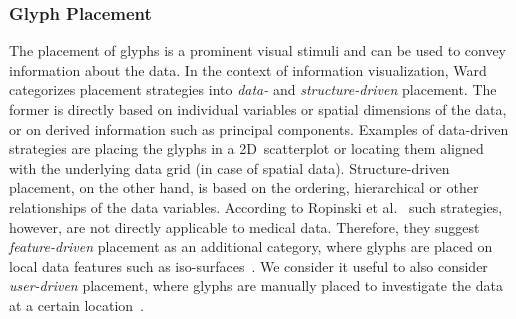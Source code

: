 




\subsubsection{Glyph Placement}

The placement of glyphs is a prominent visual stimuli and can be used
to convey information about the data.  In the context of information visualization, Ward~\cite{ward02glyphPlacement} categorizes placement 
strategies into \emph{data-} and \emph{structure-driven} placement.
The former is directly based on individual variables or spatial dimensions of the data, or on derived information such as principal components. 
Examples of data-driven strategies are placing the glyphs in a 2D~scatterplot or locating them aligned with the underlying data grid 
(in case of spatial data).
Structure-driven placement, on the other hand, is based on the ordering, hierarchical or other relationships of the data variables.
According to Ropinski et al.~\cite{Ropinski11glyphs} such strategies, however, are not directly applicable to medical data. 
Therefore, they suggest \emph{feature-driven} placement as an additional category, where glyphs are placed on local data features such as iso-surfaces~\cite{ropinski07surfaceglyphs, meyer-spradow08specGlyphs}.
We consider it useful to also consider \emph{user-driven} placement, 
where glyphs are manually placed to investigate the data at a certain location~\cite{deLeeuwVanWijk93probe, TreinishEffektiveWeather}.

